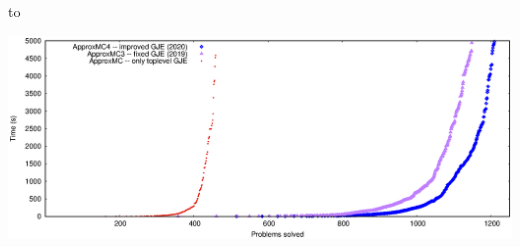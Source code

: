 \documentclass[aspectratio=196]{slides}
\def\TITLE#1{\hbox to \linewidth{\large #1\hfill}}
\def\BOTTOM{\vfill\newpage}
\def\SLIDE#1{\BOTTOM\TITLE{#1}}
\begin{document}
\vfill
\newpage
\SLIDE{Thank you!}
\vspace{2ex}

\begin{center}
\includegraphics[scale=1.4]{appmc-mate-presentation}
\end{center}

\vfill
\newpage
\end{document}
